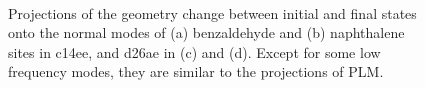\begin{figure}[!h]
\\
\caption{Projections of the geometry change between initial and final states onto the normal modes of (a) benzaldehyde and (b) naphthalene sites in c14ee, and d26ae in (c) and (d). Except for some low frequency modes, they are similar to the projections of PLM. \label{geomDiffFragProj}}
\end{figure}


